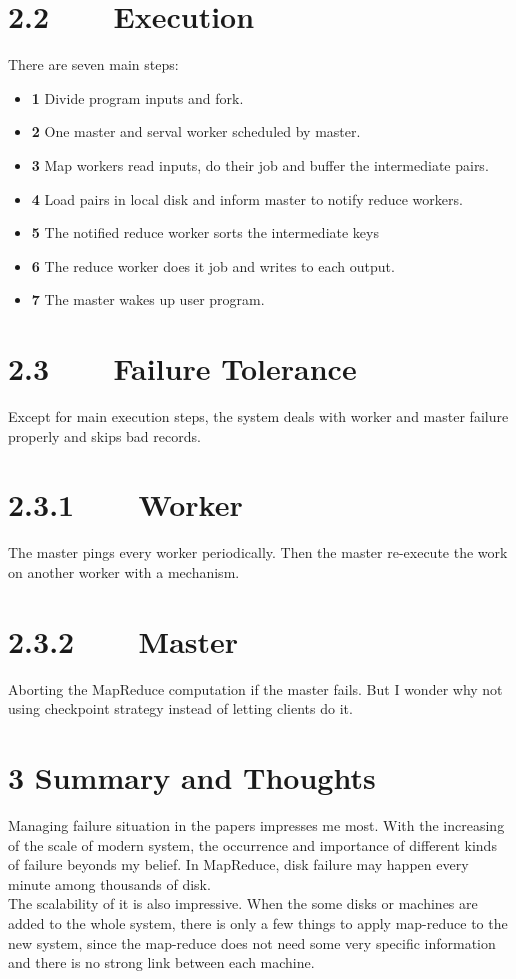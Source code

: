 \documentclass[12pt]{article}
\begin{document}
 \section*{2.2~~~~Execution}
 There are seven main steps:
 \begin{itemize}
 \item \textbf{1} Divide program inputs and fork.
 \item \textbf{2} One master and serval worker scheduled by master.
 \item \textbf{3} Map workers read inputs, do their job and  buffer the intermediate pairs.
 \item \textbf{4} Load pairs in local disk and inform master to notify reduce workers.
 \item \textbf{5} The notified reduce worker sorts the intermediate keys
 \item \textbf{6} The reduce worker does it job and writes to each output.
 \item \textbf{7} The master wakes up user program.
 \end{itemize}
 \section*{2.3~~~~Failure Tolerance}
 Except for main execution steps, the system deals with worker and master failure properly and skips bad records.
 \section*{2.3.1~~~~Worker}
 The master pings every worker periodically. Then the master re-execute the work on another worker with a mechanism. 
 \section*{2.3.2~~~~Master}
  Aborting the MapReduce computation if the master fails. But I wonder why not using checkpoint strategy instead of letting clients do it.
 \section*{3 Summary and Thoughts}
 Managing failure situation in the papers impresses me most. With the increasing of  the scale of modern system, the occurrence and importance of different kinds of failure beyonds my belief. In MapReduce, disk failure may happen every minute among thousands of disk. \\[1em]
 The scalability of it is also impressive. When the some disks or machines are added to the whole system, there is only a few things to apply map-reduce to the new system, since the map-reduce does not need some very specific information and there is no strong link between each machine.
\end{document}
